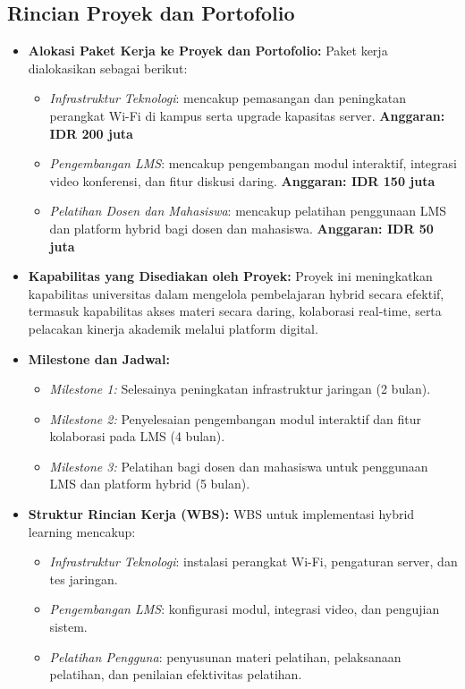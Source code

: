 \subsection{Rincian Proyek dan Portofolio}
\begin{itemize}
	\item \textbf{Alokasi Paket Kerja ke Proyek dan Portofolio:} 
	Paket kerja dialokasikan sebagai berikut:
	\begin{itemize}
		\item \textit{Infrastruktur Teknologi}: mencakup pemasangan dan peningkatan perangkat Wi-Fi di kampus serta upgrade kapasitas server. \textbf{Anggaran: IDR 200 juta}
		\item \textit{Pengembangan LMS}: mencakup pengembangan modul interaktif, integrasi video konferensi, dan fitur diskusi daring. \textbf{Anggaran: IDR 150 juta}
		\item \textit{Pelatihan Dosen dan Mahasiswa}: mencakup pelatihan penggunaan LMS dan platform hybrid bagi dosen dan mahasiswa. \textbf{Anggaran: IDR 50 juta}
	\end{itemize}
	
	\item \textbf{Kapabilitas yang Disediakan oleh Proyek:} 
	Proyek ini meningkatkan kapabilitas universitas dalam mengelola pembelajaran hybrid secara efektif, termasuk kapabilitas akses materi secara daring, kolaborasi real-time, serta pelacakan kinerja akademik melalui platform digital.
	
	\item \textbf{Milestone dan Jadwal:} 
	\begin{itemize}
		\item \textit{Milestone 1:} Selesainya peningkatan infrastruktur jaringan (2 bulan).
		\item \textit{Milestone 2:} Penyelesaian pengembangan modul interaktif dan fitur kolaborasi pada LMS (4 bulan).
		\item \textit{Milestone 3:} Pelatihan bagi dosen dan mahasiswa untuk penggunaan LMS dan platform hybrid (5 bulan).
	\end{itemize}
	
	\item \textbf{Struktur Rincian Kerja (WBS):} 
	WBS untuk implementasi hybrid learning mencakup:
	\begin{itemize}
		\item \textit{Infrastruktur Teknologi}: instalasi perangkat Wi-Fi, pengaturan server, dan tes jaringan.
		\item \textit{Pengembangan LMS}: konfigurasi modul, integrasi video, dan pengujian sistem.
		\item \textit{Pelatihan Pengguna}: penyusunan materi pelatihan, pelaksanaan pelatihan, dan penilaian efektivitas pelatihan.
	\end{itemize}
\end{itemize}

